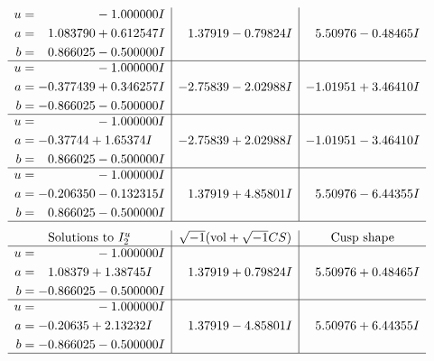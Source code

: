 \documentclass[1p]{elsarticle_modified}
\theoremstyle{definition}
\newcommand{\I}{\sqrt{-1}}
\begin{document}
$$\begin{array}{c|c|c}
\begin{aligned}
u &= \phantom{-0.000000 } -1.000000 I \\
a &= \phantom{-}1.083790 + 0.612547 I \\
b &= \phantom{-}0.866025 - 0.500000 I\end{aligned}
 & \phantom{-}1.37919 - 0.79824 I & \phantom{-}5.50976 - 0.48465 I \\ \hline\begin{aligned}
u &= \phantom{-0.000000 } -1.000000 I \\
a &= -0.377439 + 0.346257 I \\
b &= -0.866025 - 0.500000 I\end{aligned}
 & -2.75839 - 2.02988 I & -1.01951 + 3.46410 I \\ \hline\begin{aligned}
u &= \phantom{-0.000000 } -1.000000 I \\
a &= -0.37744 + 1.65374 I \\
b &= \phantom{-}0.866025 - 0.500000 I\end{aligned}
 & -2.75839 + 2.02988 I & -1.01951 - 3.46410 I \\ \hline\begin{aligned}
u &= \phantom{-0.000000 } -1.000000 I \\
a &= -0.206350 - 0.132315 I \\
b &= \phantom{-}0.866025 - 0.500000 I\end{aligned}
 & \phantom{-}1.37919 + 4.85801 I & \phantom{-}5.50976 - 6.44355 I\\
 \hline 
 \end{array}$$\newpage$$\begin{array}{c|c|c}  
\text{Solutions to }I^u_{2}& \I (\text{vol} + \sqrt{-1}CS) & \text{Cusp shape}\\
 \hline 
\begin{aligned}
u &= \phantom{-0.000000 } -1.000000 I \\
a &= \phantom{-}1.08379 + 1.38745 I \\
b &= -0.866025 - 0.500000 I\end{aligned}
 & \phantom{-}1.37919 + 0.79824 I & \phantom{-}5.50976 + 0.48465 I \\ \hline\begin{aligned}
u &= \phantom{-0.000000 } -1.000000 I \\
a &= -0.20635 + 2.13232 I \\
b &= -0.866025 - 0.500000 I\end{aligned}
 & \phantom{-}1.37919 - 4.85801 I & \phantom{-}5.50976 + 6.44355 I\\
 \hline 
 \end{array}$$\newpage
\end{document}
